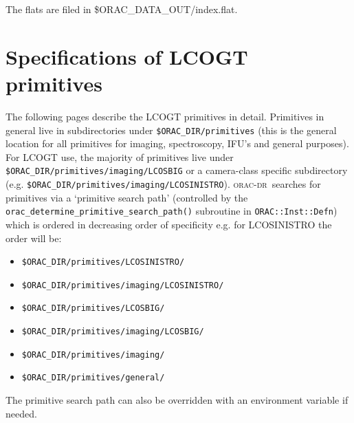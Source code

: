 \documentclass[twoside,11pt,nolof]{starlink}
\providecommand{\oracdr}{\textsc{orac-dr}}
\begin{document}
{{{         \sstitem
         The flats are filed in \$ORAC\_DATA\_OUT/index.flat.
      }
   }
}

\newpage

\section{Specifications of LCOGT primitives\label{ap:full_primitives}}

The following pages describe the LCOGT primitives in detail. Primitives in
general live in subdirectories under \verb+$ORAC_DIR/primitives+ (this is the
general location for all primitives for imaging, spectroscopy, IFU's and general
purposes). For LCOGT use, the majority of primitives live under
\verb+$ORAC_DIR/primitives/imaging/LCOSBIG+ or a camera-class specific
subdirectory (e.g. \verb+$ORAC_DIR/primitives/imaging/LCOSINISTRO+). \oracdr\ 
searches for primitives via a `primitive search path' (controlled by the
\verb+orac_determine_primitive_search_path()+ subroutine in
\verb+ORAC::Inst::Defn+) which is ordered in
decreasing order of specificity e.g. for \textsc{LCOSINISTRO} the order will be:
\begin{itemize}
\item \verb+$ORAC_DIR/primitives/LCOSINISTRO/+
\item \verb+$ORAC_DIR/primitives/imaging/LCOSINISTRO/+
\item \verb+$ORAC_DIR/primitives/LCOSBIG/+
\item \verb+$ORAC_DIR/primitives/imaging/LCOSBIG/+
\item \verb+$ORAC_DIR/primitives/imaging/+
\item \verb+$ORAC_DIR/primitives/general/+
\end{itemize}

The primitive search path can also be overridden with an environment variable if
needed.
\end{document}
